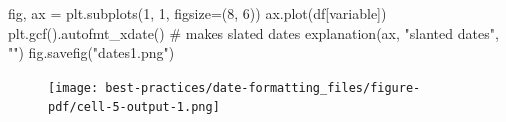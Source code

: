 \documentclass[
  letterpaper,
  DIV=11,
  numbers=noendperiod,
  oneside]{scrreprt}
\newenvironment{Shaded}{\begin{snugshade}}{\end{snugshade}}
\newcommand{\CommentTok}[1]{\textcolor[rgb]{0.37,0.37,0.37}{#1}}
\newcommand{\DecValTok}[1]{\textcolor[rgb]{0.68,0.00,0.00}{#1}}
\newcommand{\NormalTok}[1]{\textcolor[rgb]{0.00,0.23,0.31}{#1}}
\newcommand{\OperatorTok}[1]{\textcolor[rgb]{0.37,0.37,0.37}{#1}}
\newcommand{\StringTok}[1]{\textcolor[rgb]{0.13,0.47,0.30}{#1}}
\begin{document}
\begin{Shaded}
\begin{Highlighting}[]
\NormalTok{fig, ax }\OperatorTok{=}\NormalTok{ plt.subplots(}\DecValTok{1}\NormalTok{, }\DecValTok{1}\NormalTok{, figsize}\OperatorTok{=}\NormalTok{(}\DecValTok{8}\NormalTok{, }\DecValTok{6}\NormalTok{))}
\NormalTok{ax.plot(df[}\StringTok{\textquotesingle{}variable\textquotesingle{}}\NormalTok{])}
\NormalTok{plt.gcf().autofmt\_xdate()  }\CommentTok{\# makes slated dates}
\NormalTok{explanation(ax, }\StringTok{"slanted dates"}\NormalTok{, }\StringTok{""}\NormalTok{)}
\NormalTok{fig.savefig(}\StringTok{"dates1.png"}\NormalTok{)}
\end{Highlighting}
\end{Shaded}

\begin{figure}[H]

{\centering \texttt{[image: best-practices/date-formatting\_files/figure-pdf/cell-5-output-1.png]}

}

\end{figure}
\end{document}

